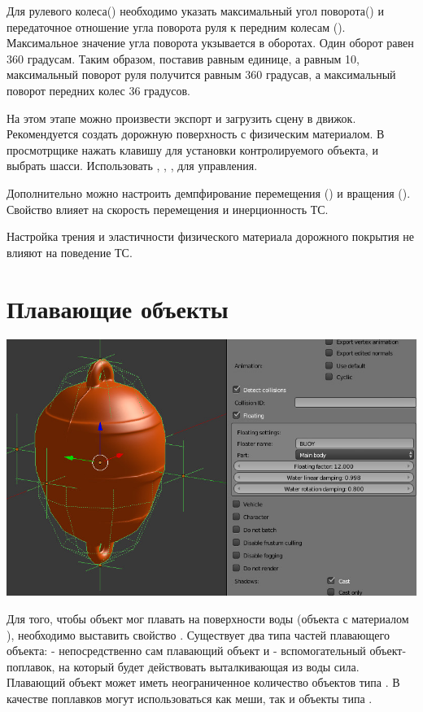 \documentclass[a4paper,12pt,oneside]{sphinxmanual}
\begin{document}
Для рулевого колеса() необходимо указать максимальный угол поворота() и передаточное отношение угла поворота руля к
передним колесам (). Максимальное значение угла поворота укзывается в оборотах. Один оборот равен 360 градусам. Таким образом,
поставив  равным единице, а  равным 10, максимальный поворот руля получится равным 360 градусав, а максимальный
поворот передних колес 36 градусов.

На этом этапе можно произвести экспорт и загрузить сцену в движок. Рекомендуется создать дорожную поверхность с физическим материалом. В просмотрщике нажать клавишу  для установки контролируемого объекта, и выбрать шасси. Использовать , , ,  для управления.

Дополнительно можно настроить демпфирование  перемещения () и вращения (). Свойство влияет на скорость перемещения и инерционность ТС.

Настройка трения и эластичности физического материала дорожного покрытия не влияют на поведение ТС.


\section{Плавающие объекты}
\label{physics:id7}
\includegraphics[width=1.000\linewidth]{physics_floater.jpg}

\begin{DUlineblock}{0em}
\item[] 
\end{DUlineblock}

Для того, чтобы объект мог плавать на поверхности воды (объекта с материалом ), необходимо выставить свойство . Существует два типа частей плавающего объекта:  - непосредственно сам плавающий объект и  - вспомогательный объект-поплавок, на который будет действовать выталкивающая из воды сила. Плавающий объект может иметь неограниченное количество объектов типа . В качестве поплавков могут использоваться как меши, так и объекты типа .
\end{document}
